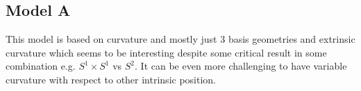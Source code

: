 \documentclass[stu, babel, american, biblatex, a4paper, leqno, draftall]{apa7}
\begin{document}
\subsection{Model A}
This model is based on curvature and mostly just 3 basis geometries and extrinsic curvature which seems to be interesting despite some critical result in some combination e.g. \(S^1 \times S^1\) vs \(S^2\). It can be even more challenging to have variable curvature with respect to other intrinsic position.
\section*{}
\printbibliography

\end{document}
